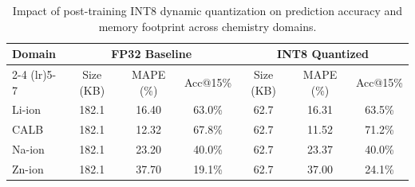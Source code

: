 \begin{table}[htbp]
\centering
\caption{Impact of post-training INT8 dynamic quantization on prediction accuracy and memory footprint across chemistry domains.}
\label{tab:int8_quantization}
\begin{tabular}{l ccc ccc}
\toprule
Domain & \multicolumn{3}{c}{FP32 Baseline} & \multicolumn{3}{c}{INT8 Quantized} \\
\cmidrule(lr){2-4} \cmidrule(lr){5-7}
 & Size (KB) & MAPE (\%) & Acc@15\% & Size (KB) & MAPE (\%) & Acc@15\% \\
\midrule
Li-ion & 182.1 & 16.40 & 63.0\% & 62.7 & 16.31 & 63.5\% \\
CALB & 182.1 & 12.32 & 67.8\% & 62.7 & 11.52 & 71.2\% \\
Na-ion & 182.1 & 23.20 & 40.0\% & 62.7 & 23.37 & 40.0\% \\
Zn-ion & 182.1 & 37.70 & 19.1\% & 62.7 & 37.00 & 24.1\% \\
\bottomrule
\end{tabular}
\end{table}
